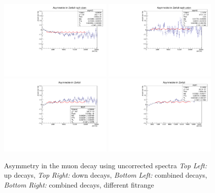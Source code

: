 \begin{figure}[H]
    \centering
    \includegraphics[width=0.49\textwidth]{figures/Asymmetrie/asy_up_nos.pdf}
    \includegraphics[width=0.49\textwidth]{figures/Asymmetrie/asy_down_nos.pdf}
    \includegraphics[width=0.49\textwidth]{figures/Asymmetrie/asy_all_nos.pdf}
    \includegraphics[width=0.49\textwidth]{figures/Asymmetrie/asy_all_nos_2.pdf}

    \caption{Asymmetry in the muon decay using uncorrected spectra \emph{Top Left:} up decays, \emph{Top Right:} down decays, \emph{Bottom Left:} combined decays, \emph{Bottom Right:} combined decays, different fitrange}
    \label{f:asy}
\end{figure}
